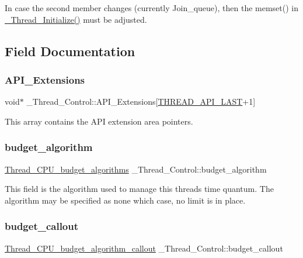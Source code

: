 In case the second member changes (currently Join\+\_\+queue), then the memset() in \mbox{\hyperlink{group__RTEMSScoreThread_gab4f561fd816d0b93318afa48f609fad2}{\+\_\+\+Thread\+\_\+\+Initialize()}} must be adjusted. 

\subsection{Field Documentation}
\mbox{\label{struct__Thread__Control_a8a8b7acd4599351bd8efcd032b6d86f4}} 
\subsubsection{\texorpdfstring{API\_Extensions}{API\_Extensions}}
{\footnotesize\ttfamily void$\ast$ \+\_\+\+Thread\+\_\+\+Control\+::\+A\+P\+I\+\_\+\+Extensions\mbox{[}\mbox{\hyperlink{group__RTEMSScoreThread_gae9eede8eaa139d657213be4d38a5f756}{T\+H\+R\+E\+A\+D\+\_\+\+A\+P\+I\+\_\+\+L\+A\+ST}}+1\mbox{]}}

This array contains the A\+PI extension area pointers. \mbox{\label{struct__Thread__Control_afd67f063faf8aa5ad9c5df575f9abcce}} 
\subsubsection{\texorpdfstring{budget\_algorithm}{budget\_algorithm}}
{\footnotesize\ttfamily \mbox{\hyperlink{group__RTEMSScoreThread_gab6f48556812ffc781a69df144ef49be0}{Thread\+\_\+\+C\+P\+U\+\_\+budget\+\_\+algorithms}} \+\_\+\+Thread\+\_\+\+Control\+::budget\+\_\+algorithm}

This field is the algorithm used to manage this thread\textquotesingle{}s time quantum. The algorithm may be specified as none which case, no limit is in place. \mbox{\label{struct__Thread__Control_afbc0a87d1f48c8ff7beef11f640e63bb}} 
\subsubsection{\texorpdfstring{budget\_callout}{budget\_callout}}
{\footnotesize\ttfamily \mbox{\hyperlink{group__RTEMSScoreThread_ga2f15cbe9653e5bfcb2595454e9ffd14a}{Thread\+\_\+\+C\+P\+U\+\_\+budget\+\_\+algorithm\+\_\+callout}} \+\_\+\+Thread\+\_\+\+Control\+::budget\+\_\+callout}

